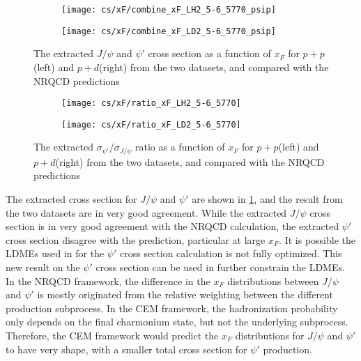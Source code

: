 \documentclass[../main.tex]{subfiles}
\begin{document}
\begin{figure}[h!]
	\centering
	\begin{subfigure}{0.45\linewidth}
		\texttt{[image: cs/xF/combine\_xF\_LH2\_5-6\_5770\_psip]}
	\end{subfigure}
	\centering
	\begin{subfigure}{0.45\linewidth}
		\texttt{[image: cs/xF/combine\_xF\_LD2\_5-6\_5770\_psip]}
	\end{subfigure}
	\caption{The extracted $J/\psi$ and $\psi'$ cross section as a function of $x_F$ for $p+p$(left)
		and $p+d$(right) from the two datasets,	and compared with the NRQCD predictions}
	\label{fig:cs_xF_combined}
\end{figure}
\begin{figure}[h!]
	\centering
	\begin{subfigure}{0.45\linewidth}
		\texttt{[image: cs/xF/ratio\_xF\_LH2\_5-6\_5770]}
	\end{subfigure}
	\begin{subfigure}{0.45\linewidth}
		\texttt{[image: cs/xF/ratio\_xF\_LD2\_5-6\_5770]}
	\end{subfigure}
	\caption{The extracted  $\sigma_{\psi'}/\sigma_{J/\psi}$ ratio as a function of $x_F$ for $p+p$(left)
		and $p+d$(right) from the two datasets,	and compared with the NRQCD predictions}
\end{figure}

The extracted cross section for $J/\psi$ and $\psi'$ are shown in \cref{fig:cs_xF_combined}, and
the result from the two datasets are in very good agreement. While the extracted
$J/\psi$ cross section is in very good agreement with the NRQCD calculation, the extracted $\psi'$
cross section disagree with the prediction, particular at large $x_F$. It is possible the LDMEs used
in for the $\psi'$ cross section calculation is not fully optimized. This new result on the $\psi'$
cross section can be used in further constrain the LDMEs. In the NRQCD framework, the difference in the
$x_F$ distributions between $J/\psi$ and $\psi'$ is mostly originated from the relative weighting between
the different production subprocess. In the CEM framework, the hadronization probability only depends on
the final charmonium state, but not the underlying subprocess. Therefore, the CEM framework would predict
the $x_F$ distributions for $J/\psi$ and $\psi'$ to have very shape, with a smaller total cross section
for $\psi'$ production.
\end{document}
